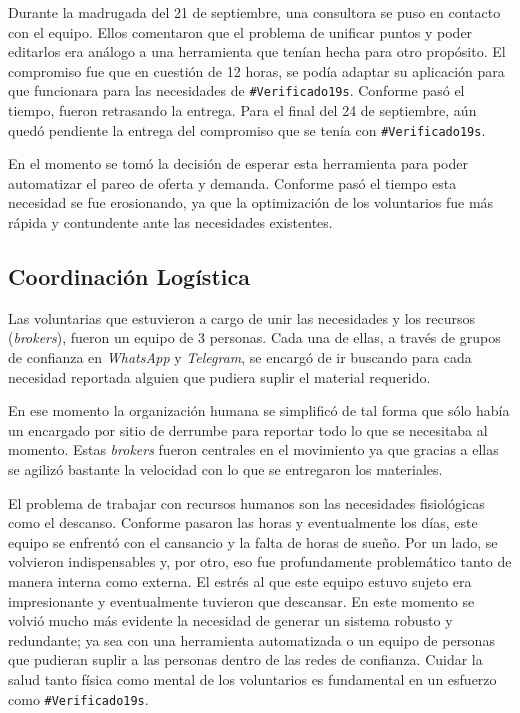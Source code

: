 \documentclass[12pt,spanish,oneside,breaklinks]{book}
\begin{document}
Durante la madrugada del 21 de septiembre, una consultora se puso en contacto con el equipo. Ellos comentaron que el problema de unificar puntos y poder editarlos era análogo a una herramienta que tenían hecha para otro propósito. El compromiso fue que en cuestión de 12 horas, se podía adaptar su aplicación para que funcionara para las necesidades de \texttt{\#Verificado19s}. Conforme pasó el tiempo, fueron retrasando la entrega. Para el final del 24 de septiembre, aún quedó pendiente la entrega del compromiso que se tenía con \texttt{\#Verificado19s}.

En el momento se tomó la decisión de esperar esta herramienta para poder automatizar el pareo de oferta y demanda. Conforme pasó el tiempo esta necesidad se fue erosionando, ya que la optimización de los voluntarios fue más rápida y contundente ante las necesidades existentes.

\subsection{Coordinación Logística}
\label{sec:org60a454e}

Las voluntarias que estuvieron a cargo de unir las necesidades y los recursos (\emph{brokers}), fueron un equipo de 3 personas. Cada una de ellas, a través de grupos de confianza en \emph{WhatsApp} y \emph{Telegram}, se encargó de ir buscando para cada necesidad reportada alguien que pudiera suplir el material requerido.

En ese momento la organización humana se simplificó de tal forma que sólo había un encargado por sitio de derrumbe para reportar todo lo que se necesitaba al momento. Estas \emph{brokers} fueron centrales en el movimiento ya que gracias a ellas se agilizó bastante la velocidad con lo que se entregaron los materiales.

El problema de trabajar con recursos humanos son las necesidades fisiológicas como el descanso. Conforme pasaron las horas y eventualmente los días, este equipo se enfrentó con el cansancio y la falta de horas de sueño. Por un lado, se volvieron indispensables y, por otro, eso fue profundamente problemático tanto de manera interna como externa. El estrés al que este equipo estuvo sujeto era impresionante y eventualmente tuvieron que descansar. En este momento se volvió mucho más evidente la necesidad de generar un sistema robusto y redundante; ya sea con una herramienta automatizada o un equipo de personas que pudieran suplir a las personas dentro de las redes de confianza. Cuidar la salud tanto física como mental de los voluntarios es fundamental en un esfuerzo como \texttt{\#Verificado19s}.
\end{document}
